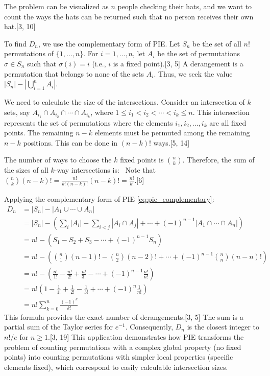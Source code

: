 \documentclass[11pt]{amsart}
\theoremstyle{plain}
\theoremstyle{definition}
\theoremstyle{remark}
\begin{document}
The problem can be visualized as $n$ people checking their hats, and we want to count the ways the hats can be returned such that no person receives their own hat.[3, 10]

To find $D_n$, we use the complementary form of PIE. Let $S_n$ be the set of all $n!$ permutations of $\{1, \ldots, n\}$. For $i = 1, \ldots, n$, let $A_i$ be the set of permutations $\sigma \in S_n$ such that $\sigma(i) = i$ (i.e., $i$ is a fixed point).[3, 5] A derangement is a permutation that belongs to none of the sets $A_i$. Thus, we seek the value $|S_n| - |\bigcup_{i=1}^n A_i|$.

We need to calculate the size of the intersections. Consider an intersection of $k$ sets, say $A_{i_1} \cap A_{i_2} \cap \cdots \cap A_{i_k}$, where $1 \le i_1 < i_2 < \cdots < i_k \le n$. This intersection represents the set of permutations where the elements $i_1, i_2, \ldots, i_k$ are all fixed points. The remaining $n-k$ elements must be permuted among the remaining $n-k$ positions. This can be done in $(n-k)!$ ways.[5, 14]

The number of ways to choose the $k$ fixed points is $\binom{n}{k}$. Therefore, the sum of the sizes of all $k$-way intersections is:
\
Note that $\binom{n}{k} (n-k)! = \frac{n!}{k!(n-k)!} (n-k)! = \frac{n!}{k!}$.[6]

Applying the complementary form of PIE \eqref{eq:pie_complementary}:
\begin{align*}
D_n &= |S_n| - |A_1 \cup \cdots \cup A_n| \\
&= |S_n| - \left( \sum_i |A_i| - \sum_{i<j} |A_i \cap A_j| + \cdots + (-1)^{n-1} |A_1 \cap \cdots \cap A_n| \right) \\
&= n! - \left( S_1 - S_2 + S_3 - \cdots + (-1)^{n-1} S_n \right) \\
&= n! - \left( \binom{n}{1}(n-1)! - \binom{n}{2}(n-2)! + \cdots + (-1)^{n-1} \binom{n}{n}(n-n)! \right) \\
&= n! - \left( \frac{n!}{1!} - \frac{n!}{2!} + \frac{n!}{3!} - \cdots + (-1)^{n-1} \frac{n!}{n!} \right) \\
&= n! \left( 1 - \frac{1}{1!} + \frac{1}{2!} - \frac{1}{3!} + \cdots + (-1)^n \frac{1}{n!} \right) \\
&= n! \sum_{k=0}^n \frac{(-1)^k}{k!}
\label{eq:derangements}
\end{align*}
This formula provides the exact number of derangements.[3, 5] The sum is a partial sum of the Taylor series for $e^{-1}$. Consequently, $D_n$ is the closest integer to $n!/e$ for $n \ge 1$.[3, 19] This application demonstrates how PIE transforms the problem of counting permutations with a complex global property (no fixed points) into counting permutations with simpler local properties (specific elements fixed), which correspond to easily calculable intersection sizes.
\end{document}
